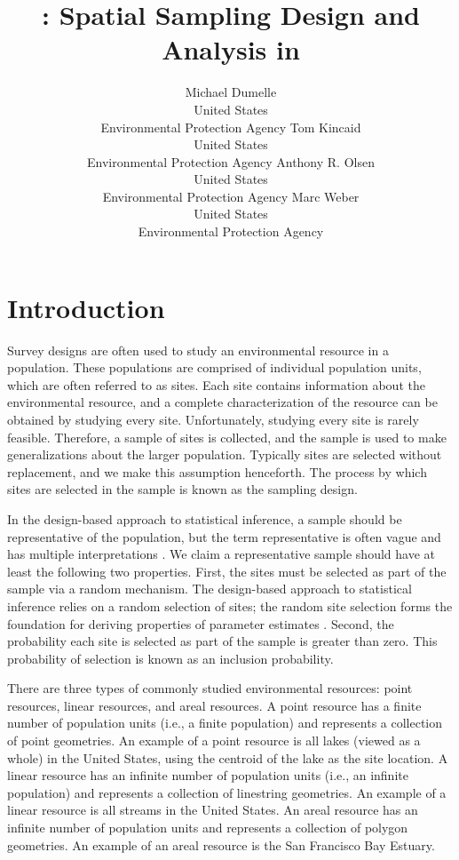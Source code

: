 \documentclass[
  shortnames]{jss}
\author{
Michael Dumelle\\United States\\
Environmental Protection Agency \And Tom Kincaid\\United States\\
Environmental Protection Agency \AND Anthony R. Olsen\\United States\\
Environmental Protection Agency \And Marc Weber\\United States\\
Environmental Protection Agency
}
\title{\pkg{spsurvey}: Spatial Sampling Design and Analysis in \proglang{R}}
\begin{document}
\linenumbers

\hypertarget{sec:introduction}{%
\section{Introduction}\label{sec:introduction}}

Survey designs are often used to study an environmental resource in a
population. These populations are comprised of individual population
units, which are often referred to as sites. Each site contains
information about the environmental resource, and a complete
characterization of the resource can be obtained by studying every site.
Unfortunately, studying every site is rarely feasible. Therefore, a
sample of sites is collected, and the sample is used to make
generalizations about the larger population. Typically sites are
selected without replacement, and we make this assumption henceforth.
The process by which sites are selected in the sample is known as the
sampling design.

In the design-based approach to statistical inference, a sample should
be representative of the population, but the term representative is
often vague and has multiple interpretations
\citep{kruskal1979representativea, kruskal1979representativeb, kruskal1979representativec}.
We claim a representative sample should have at least the following two
properties. First, the sites must be selected as part of the sample via
a random mechanism. The design-based approach to statistical inference
relies on a random selection of sites; the random site selection forms
the foundation for deriving properties of parameter estimates
\citep{sarndal2003model, lohr2009sampling}. Second, the probability each
site is selected as part of the sample is greater than zero. This
probability of selection is known as an inclusion probability.

There are three types of commonly studied environmental resources: point
resources, linear resources, and areal resources. A point resource has a
finite number of population units (i.e., a finite population) and
represents a collection of point geometries. An example of a point
resource is all lakes (viewed as a whole) in the United States, using
the centroid of the lake as the site location. A linear resource has an
infinite number of population units (i.e., an infinite population) and
represents a collection of linestring geometries. An example of a linear
resource is all streams in the United States. An areal resource has an
infinite number of population units and represents a collection of
polygon geometries. An example of an areal resource is the San Francisco
Bay Estuary.
\end{document}
